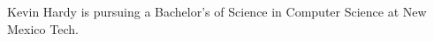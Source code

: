 \documentclass[journal]{IEEEtran}
\begin{document}
 


% 

\begin{IEEEbiographynophoto}{Kevin Hardy}
is pursuing a Bachelor's of Science in Computer Science at New Mexico Tech.
\end{IEEEbiographynophoto}







\end{document}
